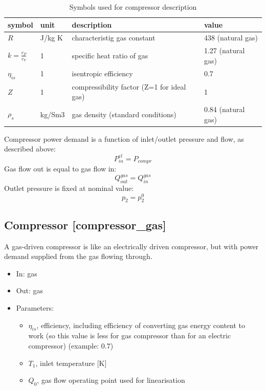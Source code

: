 \documentclass[12pt]{article}
\begin{document}
\begin{table}[]
\caption{Symbols used for compressor description}
\label{tab:compressorsymbols}
\begin{tabular}{llp{12em}l}
\hline
symbol    		& unit   & description                                & value              \\
\hline
$R$         		& J/kg K & characteristig gas constant                & 438 (natural gas)  \\
$k=\frac{c_P}{c_V}$ & 1      & specific heat ratio of gas                 & 1.27 (natural gas) \\
$\eta_{is}$      & 1      & isentropic efficiency                      & 0.7                \\
$Z$         		& 1      & compressibility factor (Z=1 for ideal gas) & 1                  \\
$\rho_s$		& kg/Sm3 & gas density (standard conditions)          & 0.84 (natural gas) \\
\hline
\end{tabular}
\end{table}


Compressor power demand is a function of inlet/outlet pressure and flow, as described above:
 \begin{equation}
 	 P^{el}_{in}=P_{compr} 
\end{equation} 
Gas flow out is equal to gas flow in:
\begin{equation}
	 Q_{out}^{gas}=Q_{in}^{gas}
\end{equation} 
Outlet pressure is fixed at nominal value:
\begin{equation}
	p_{2}=p_{2}^{0} 
\end{equation}


\subsection{Compressor [compressor\_gas]}

A gas-driven compressor is like an electrically driven compressor, but with power demand supplied from the gas flowing through.


\begin{itemize}
\item In: gas
\item Out: gas
\item Parameters:
\begin{itemize}[noitemsep,topsep=0pt]
	\item $\eta_{is}$,  efficiency, including efficiency of converting gas energy content to work (so this value is less for gas compressor than for an electric compressor) (example: 0.7)
	\item $T_1$, inlet temperature [K]
	\item $Q_0$, gas flow operating point used for linearisation
\end{itemize}
\end{itemize}
\end{document}

